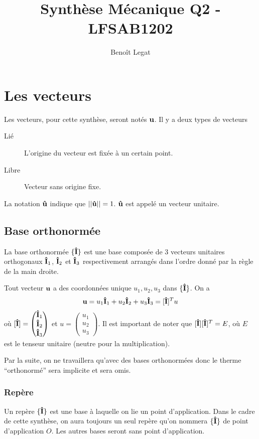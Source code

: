 \documentclass[11pt,a4paper]{article}
\title{Synthèse Mécanique Q2 - LFSAB1202}
\author{Benoît Legat}
\newcommand\fv[1]{{\bf #1}} %
\newcommand\uv[1]{{\bf\hat{ #1}}} %
\newcommand\ui{{\bf\hat{I}}} %
\begin{document}
\maketitle
\section{Les vecteurs}

Les vecteurs, pour cette synthèse, seront notés $\fv{u}$.
Il y a deux types de vecteurs
\begin{description}
	\item[Lié] L'origine du vecteur est fixée à un certain point.
	\item[Libre] Vecteur sans origine fixe.
\end{description}
La notation $\uv{u}$ indique que $||\uv{u}|| = 1$.
$\uv{u}$ est appelé un vecteur unitaire.

\subsection{Base orthonormée}

La base orthonormée $\{\ui\}$ est une base composée de 3 vecteurs unitaires orthogonaux $\ui_1$, $\ui_2$ et $\ui_3$ respectivement arrangés dans l'ordre donné par la règle de la main droite.

Tout vecteur $\fv{u}$ a des coordonnées unique $u_1, u_2, u_3$ dans $\{\ui\}$.
On a
\[ \fv{u} = u_1\ui_1 + u_2\ui_2 + u_3\ui_3 = [\ui]^T u \]
	où $[\ui] = \begin{pmatrix}\ui_1\\\ui_2\\\ui_3\end{pmatrix}$ et $u = \begin{pmatrix} u_1 \\ u_2 \\ u_3 \end{pmatrix}$.
Il est important de noter que $[\ui][\ui]^T = E$, où $E$ est le tenseur unitaire (neutre pour la multiplication).

Par la suite, on ne travaillera qu'avec des bases orthonormées donc le therme ``orthonormé'' sera implicite et sera omis.

\subsubsection{Repère}
Un repère $\{\ui\}$ est une base à laquelle on lie un point d'application.
Dans le cadre de cette synthèse, on aura toujours un seul repère qu'on nommera $\{\ui\}$ de point d'application $O$.
Les autres bases seront sans point d'application.
\end{document}
